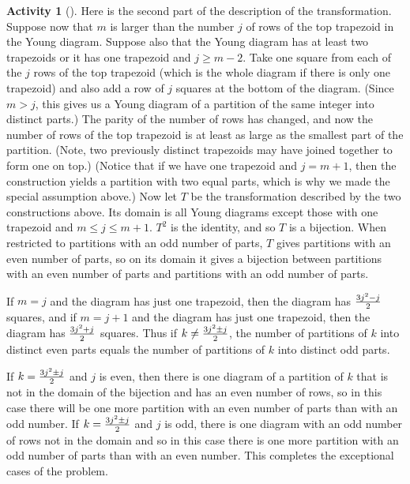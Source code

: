 \documentclass[10pt,]{book}
\theoremstyle{plain}
\theoremstyle{definition}
\newtheorem{activity}[project]{Activity}
\numberwithin{equation}{chapter}
\begin{document}
\begin{activity}[]
Here is the second part of the description of the transformation. Suppose now that \(m\) is larger than the number \(j\) of rows of the top trapezoid in the Young diagram. Suppose also that the Young diagram has at least two trapezoids or it has one trapezoid and \(j\ge m-2\). Take one square from each of the \(j\) rows of the top trapezoid (which is the whole diagram if there is only one trapezoid) and also add a row of \(j\) squares at the bottom of the diagram. (Since \(m>j\), this gives us a Young diagram of a partition of the same integer into distinct parts.) The parity of the number of rows has changed, and now the number of rows of the top trapezoid is at least as large as the smallest part of the partition. (Note, two previously distinct trapezoids may have joined together to form one on top.)  (Notice that if we have one trapezoid and \(j= m+1\), then the construction yields a partition with two equal parts, which is why we made the special assumption above.) Now let \(T\) be the transformation described by the two constructions above. Its domain is all Young diagrams except those with one trapezoid and \(m\le j\le m+1\). \(T^2\) is the identity, and so \(T\) is a bijection.  When restricted to partitions with an odd number of parts, \(T\) gives partitions with an even number of parts, so on its domain it gives a bijection between partitions with an even number of parts and partitions with an odd number of parts.%
\par
If \(m=j\) and the diagram has just one trapezoid, then the diagram has \(3j^2-j\over 2\) squares, and if \(m=j+1\) and the diagram has just one trapezoid, then the diagram has \(3j^2+j\over 2\) squares. Thus if \(k\ne {3j^2\pm j\over 2}\), the number of partitions of \(k\) into distinct even parts equals the number of partitions of \(k\) into distinct odd parts.%
\par
If \(k= {3j^2\pm j\over 2}\) and \(j\) is even, then there is one diagram of a partition of \(k\) that is not in the domain of the bijection and has an even number of rows, so in this case there will be one more partition with an even number of parts than with an odd number. If \(k= {3j^2\pm j\over 2}\) and \(j\) is odd, there is one diagram with an odd number of rows not in the domain and so in this case there is one more partition with an odd number of parts than with an even number. This completes the exceptional cases of the problem.%
\end{activity}
\typeout{************************************************}
\typeout{************************************************}
\end{document}
